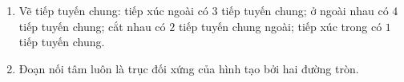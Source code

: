 \begin{enumerate}
\item Vẽ tiếp tuyến chung: tiếp xúc ngoài có $3$ tiếp tuyến chung; ở ngoài nhau có $4$ tiếp tuyến chung; cắt nhau có $2$ tiếp tuyến chung ngoài; tiếp xúc trong có $1$ tiếp tuyến chung.
\item Đoạn nối tâm luôn là trục đối xứng của hình tạo bởi hai đường tròn.
\end{enumerate}
